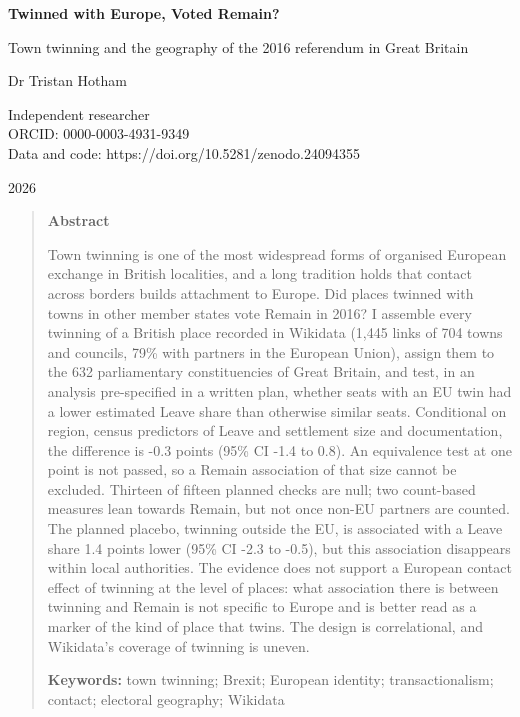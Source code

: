 \documentclass[11pt,a4paper]{article}
\begin{document}
\begin{center}
{\Large\bfseries Twinned with Europe, Voted Remain?\par}
\vspace{0.4em}
{\large Town twinning and the geography of the 2016 referendum in Great Britain\par}
\vspace{1.2em}
{\large Dr Tristan Hotham\par}
\vspace{0.3em}
{\small Independent researcher\\
ORCID: 0000-0003-4931-9349\\
Data and code: https://doi.org/10.5281/zenodo.24094355\par}
\vspace{0.8em}
2026
\end{center}

\begin{quote}
\small
\begin{center}\textbf{Abstract}\end{center}
Town twinning is one of the most widespread forms of organised European exchange in British localities, and a long tradition holds that contact across borders builds attachment to Europe. Did places twinned with towns in other member states vote Remain in 2016? I assemble every twinning of a British place recorded in Wikidata (1,445 links of 704 towns and councils, 79\% with partners in the European Union), assign them to the 632 parliamentary constituencies of Great Britain, and test, in an analysis pre-specified in a written plan, whether seats with an EU twin had a lower estimated Leave share than otherwise similar seats. Conditional on region, census predictors of Leave and settlement size and documentation, the difference is -0.3 points (95\% CI -1.4 to 0.8). An equivalence test at one point is not passed, so a Remain association of that size cannot be excluded. Thirteen of fifteen planned checks are null; two count-based measures lean towards Remain, but not once non-EU partners are counted. The planned placebo, twinning outside the EU, is associated with a Leave share 1.4 points lower (95\% CI -2.3 to -0.5), but this association disappears within local authorities. The evidence does not support a European contact effect of twinning at the level of places: what association there is between twinning and Remain is not specific to Europe and is better read as a marker of the kind of place that twins. The design is correlational, and Wikidata's coverage of twinning is uneven.

\textbf{Keywords:} town twinning; Brexit; European identity; transactionalism; contact; electoral geography; Wikidata
\end{quote}
\end{document}
